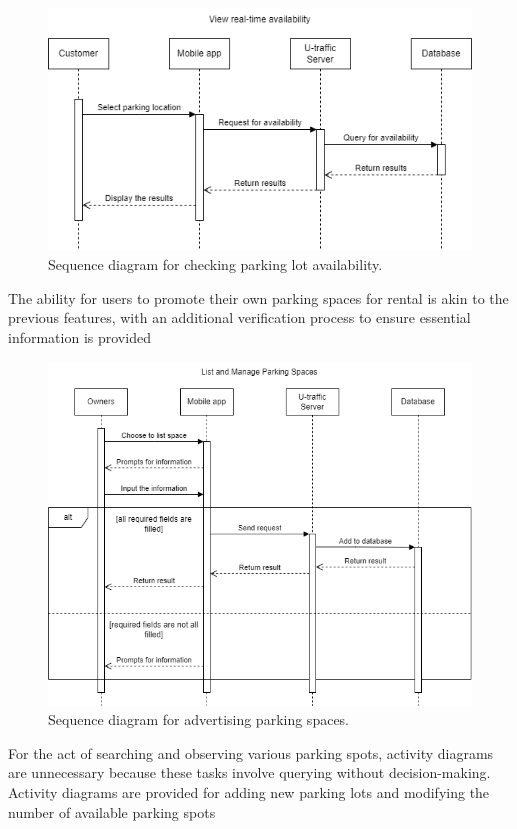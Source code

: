 \begin{figure}[H]
    \centering
    \includegraphics[width=\linewidth]{assets/images/Implementation/Parking/Availability.drawio.png}
    \caption{Sequence diagram for checking parking lot availability.}
    \label{fig:parking_availability}
\end{figure}

The ability for users to promote their own parking spaces for rental is akin to the previous features, with an additional verification process to ensure essential information is provided

\begin{figure}[H]
    \centering
    \includegraphics[width=0.75\linewidth]{assets/images/Implementation/Parking/List and Manage.drawio.png}
    \caption{Sequence diagram for advertising parking spaces.}
    \label{fig:parking_search}
\end{figure}


For the act of searching and observing various parking spots, activity diagrams are unnecessary because these tasks involve querying without decision-making. Activity diagrams are provided for adding new parking lots and modifying the number of available parking spots

